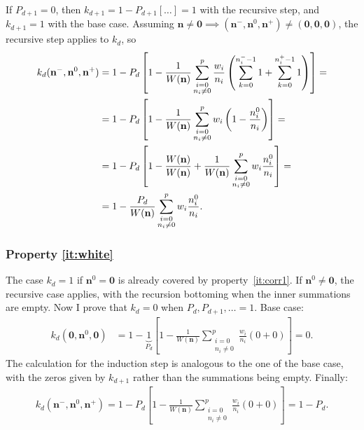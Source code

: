 \documentclass[a4paper]{article}
\newcommand{\nvecs}{\mathbf n^-, \mathbf n^0, \mathbf n^+}
\theoremstyle{definition}
\begin{document}
    If $P_{d+1} = 0$, then $k_{d+1} = 1 - P_{d+1} [\ldots] = 1$ with the recursive step, and $k_{d+1} = 1$ with the base case. Assuming $\mathbf n \ne \mathbf 0 \implies (\nvecs) \ne (\mathbf 0,\mathbf 0,\mathbf 0)$, the recursive step applies to $k_d$, so
    \begin{align}
        k_d(\nvecs) &= 1 - P_d \left[
            1 - \frac1{W(\mathbf n)} \sum_{\substack{i=0 \\ n_i\ne 0}}^{p} \frac{w_i}{n_i} \left(
                \sum_{k=0}^{n^-_i-1} 1 + \sum_{k=0}^{n^+_i-1} 1
            \right)
        \right] = \notag \\
        &= 1 - P_d \left[1 - \frac1{W(\mathbf n)} \sum_{\substack{i=0 \\ n_i\ne 0}}^{p} w_i \left( 1 - \frac{n^0_i}{n_i} \right) \right] = \notag \\
        &= 1 - P_d \left[1 - \frac{W(\mathbf n)}{W(\mathbf n)} + \frac1{W(\mathbf n)} \sum_{\substack{i=0 \\ n_i\ne 0}}^{p} w_i \frac{n^0_i}{n_i} \right] = \notag \\
        &= 1 - \frac{P_d}{W(\mathbf n)} \sum_{\substack{i=0 \\ n_i\ne 0}}^{p} w_i \frac{n^0_i}{n_i}.
    \end{align}

    \subsubsection{Property \ref{it:white}}

    The case $k_d = 1$ if $\mathbf n^0 = \mathbf 0$ is already covered by property~\ref{it:corr1}. If $\mathbf n^0 \ne \mathbf 0$, the recursive case applies, with the recursion bottoming when the inner summations are empty. Now I prove that $k_d=0$ when $P_d, P_{d+1}, \ldots = 1$. Base case:
    \begin{align}
        k_d(\mathbf 0, \mathbf n^0, \mathbf 0)
        &= 1 - \underbrace{1}_{P_d}\left[
            1 - \frac1{W(\mathbf n)} \sum_{\substack{i=0 \\ n_i\ne 0}}^{p} \frac{w_i}{n_i} (0 + 0)
        \right] = 0.
    \end{align}
    The calculation for the induction step is analogous to the one of the base case, with the zeros given by $k_{d+1}$ rather than the summations being empty. Finally:
    \begin{align}
        k_d(\nvecs) = 1 - P_d\left[1 - \frac1{W(\mathbf n)} \sum_{\substack{i=0 \\ n_i\ne 0}}^{p} \frac{w_i}{n_i} (0 + 0) \right]
        = 1 - P_d.
    \end{align}
\end{document}
